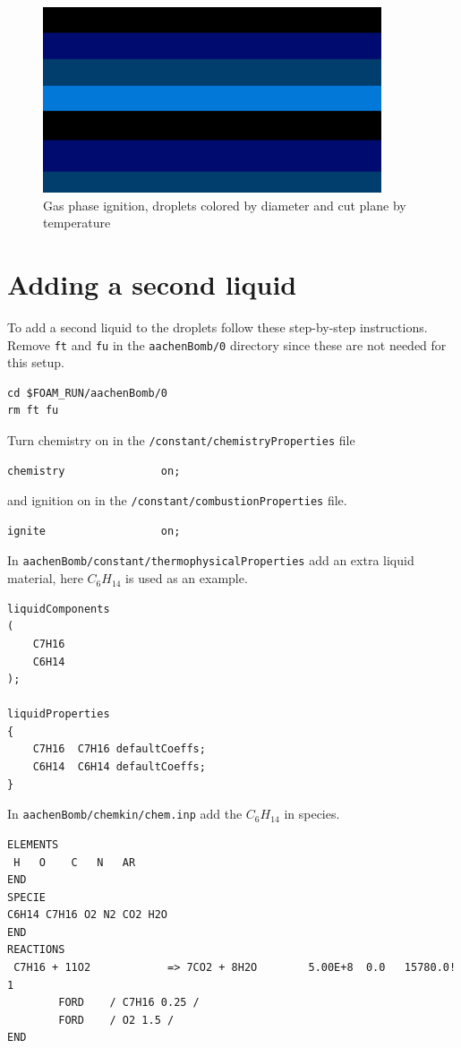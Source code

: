\documentclass{report}
\begin{document}
\begin{figure}[ht]
\begin{center}
\includegraphics[width=10cm]{ignition.png}
\end{center}
\caption{Gas phase ignition, droplets colored by diameter and cut plane by temperature}
\label{Gas phase ignition, droplets colored by diameter and cut plane by temperature}
\end{figure}

\newpage
\section{Adding a second liquid}
\label{Adding a second liquid to the the droplet}
To add a second liquid to the droplets follow these step-by-step instructions.\newline
\newline
\noindent
Remove \verb+ft+ and \verb+fu+  in the \verb+aachenBomb/0+ directory  since these are not needed for this setup.
\begin{verbatim}
cd $FOAM_RUN/aachenBomb/0
rm ft fu 
\end{verbatim} 
Turn chemistry on in the \verb+/constant/chemistryProperties+ file

\begin{verbatim}
chemistry               on;
\end{verbatim} 

\noindent
and ignition on in the \verb+/constant/combustionProperties+  file.

\begin{verbatim}
ignite              	on;
\end{verbatim} 

\noindent
In \verb+aachenBomb/constant/thermophysicalProperties+ add an extra liquid material, here $C_{6}H_{14}$ is used as an example. 
\begin{verbatim}
liquidComponents
(
    C7H16
    C6H14
);

liquidProperties
{
    C7H16  C7H16 defaultCoeffs;
    C6H14  C6H14 defaultCoeffs;
}
\end{verbatim}
In \verb+aachenBomb/chemkin/chem.inp+ add the $C_{6}H_{14}$ in species.
\begin{verbatim}
ELEMENTS
 H   O    C   N   AR
END
SPECIE
C6H14 C7H16 O2 N2 CO2 H2O
END
REACTIONS
 C7H16 + 11O2            => 7CO2 + 8H2O        5.00E+8  0.0   15780.0! 1
        FORD    / C7H16 0.25 /
        FORD    / O2 1.5 /
END
\end{verbatim}
\end{document}
